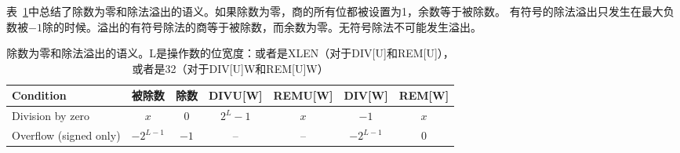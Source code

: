 表~\ref{tab:divby0}中总结了除数为零和除法溢出的语义。如果除数为零，商的所有位都被设置为1，余数等于被除数。
有符号的除法溢出只发生在最大负数被$-1$除的时候。溢出的有符号除法的商等于被除数，而余数为零。无符号除法不可能发生溢出。

\begin{table}[h]
\center
\begin{tabular}{|l|c|c||c|c|c|c|}
\hline
Condition              & 被除数   & 除数 & DIVU[W]   & REMU[W] & DIV[W]     & REM[W] \\ \hline
Division by zero       & $x$        & 0       & $2^{L}-1$ & $x$     & $-1$       & $x$    \\
Overflow (signed only) & $-2^{L-1}$ & $-1$    & --        & --      & $-2^{L-1}$ & 0      \\
\hline
\end{tabular}
\caption{除数为零和除法溢出的语义。L是操作数的位宽度：或者是XLEN（对于DIV[U]和REM[U]），或者是32（对于DIV[U]W和REM[U]W）
}
\label{tab:divby0}
\end{table}

